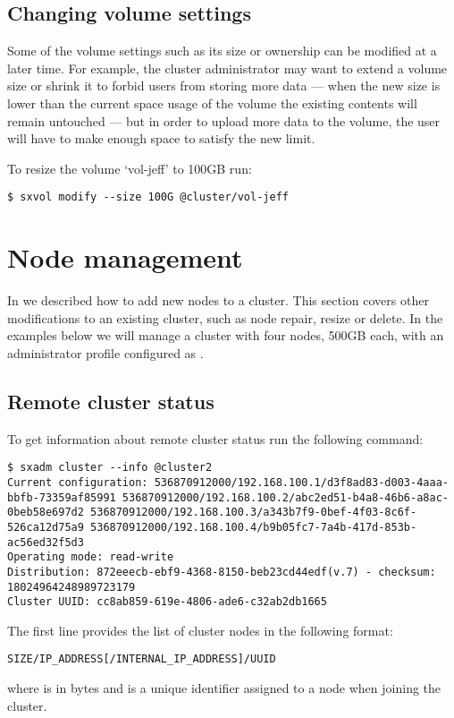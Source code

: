 \subsection{Changing volume settings}
Some of the volume settings such as its size or ownership can be
modified at a later time. For example, the cluster administrator may
want to extend a volume size or shrink it to forbid users from storing
more data --- when the new size is lower than the current space usage of
the volume the existing contents will remain untouched --- but in order
to upload more data to the volume, the user will have to make enough
space to satisfy the new limit.

To resize the volume `vol-jeff' to 100GB run:
\begin{lstlisting}
$ sxvol modify --size 100G @cluster/vol-jeff
\end{lstlisting}

\section{Node management}
In  we described how to add new nodes to a cluster. This
section covers other modifications to an existing cluster, such as node
repair, resize or delete. In the examples below we will manage a cluster
with four nodes, 500GB each, with an administrator profile configured
as .

\subsection{Remote cluster status}
To get information about remote cluster status run the following command:
\begin{lstlisting}
$ sxadm cluster --info @cluster2
Current configuration: 536870912000/192.168.100.1/d3f8ad83-d003-4aaa-bbfb-73359af85991 536870912000/192.168.100.2/abc2ed51-b4a8-46b6-a8ac-0beb58e697d2 536870912000/192.168.100.3/a343b7f9-0bef-4f03-8c6f-526ca12d75a9 536870912000/192.168.100.4/b9b05fc7-7a4b-417d-853b-ac56ed32f5d3 
Operating mode: read-write
Distribution: 872eeecb-ebf9-4368-8150-beb23cd44edf(v.7) - checksum: 18024964248989723179
Cluster UUID: cc8ab859-619e-4806-ade6-c32ab2db1665
\end{lstlisting}
The first line provides the list of cluster nodes in the following format:
\begin{lstlisting}
SIZE/IP_ADDRESS[/INTERNAL_IP_ADDRESS]/UUID
\end{lstlisting}
where  is in bytes and  is a unique identifier assigned to a node
when joining the cluster.

